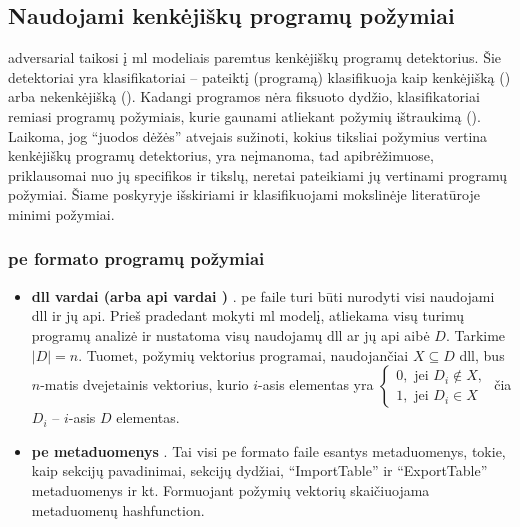 \subsection{Naudojami kenkėjiškų programų požymiai}\label{sec:literature:features}
\Gls{adversarial} taikosi į \acs{ml} modeliais paremtus kenkėjiškų programų detektorius. Šie detektoriai yra klasifikatoriai -- pateiktį (programą) klasifikuoja kaip kenkėjišką () arba nekenkėjišką (). Kadangi programos nėra fiksuoto dydžio, klasifikatoriai remiasi programų požymiais, kurie gaunami atliekant požymių ištraukimą (). Laikoma, jog \enquote{juodos dėžės} atvejais sužinoti, kokius tiksliai požymius vertina kenkėjiškų programų detektorius, yra neįmanoma, tad  apibrėžimuose, priklausomai nuo jų specifikos ir tikslų, neretai pateikiami jų vertinami programų požymiai. Šiame poskyryje išskiriami ir klasifikuojami mokslinėje literatūroje minimi požymiai.

\subsubsection{\acs{pe} formato programų požymiai}\label{sec:literature:features:pe}
\begin{itemize}
    \item \textbf{\acs{dll} vardai (arba \acs{api} vardai \cite{huGeneratingAdversarialMalware2017})} \cite{zhongMalFoxCamouflagedAdversarial2024}. \acs{pe} faile turi būti nurodyti visi naudojami \acs{dll} ir jų \acs{api}. Prieš pradedant mokyti \acs{ml} modelį, atliekama visų turimų programų analizė ir nustatoma visų naudojamų \acs{dll} ar jų \acs{api} aibė $D$. Tarkime $|D| = n$. Tuomet, požymių vektorius programai, naudojančiai $X \subseteq D$ \acs{dll}, bus $n$-matis dvejetainis vektorius, kurio $i$-asis elementas yra $\begin{cases}
        0, \text{ jei } D_i \not \in X, \\
        1, \text{ jei } D_i \in X
    \end{cases}$ čia $D_i$ -- $i$-asis $D$ elementas.
    \item \textbf{\acs{pe} metaduomenys} \cite{andersonLearningEvadeStatic2018}. Tai visi \acs{pe} formato faile esantys metaduomenys, tokie, kaip sekcijų pavadinimai, sekcijų dydžiai, \enquote{ImportTable} ir \enquote{ExportTable} metaduomenys ir kt. Formuojant požymių vektorių skaičiuojama metaduomenų \gls{hashfunction}.
\end{itemize}

